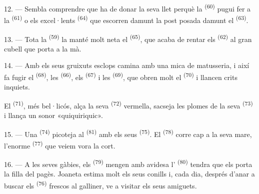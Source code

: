 12. --- Sembla comprendre que ha de donar la seva llet perquè la 
\textsuperscript{(60)} pugui fer  a la 
\textsuperscript{(61)} o els excel·lents 
\textsuperscript{(64)} que escorren damunt la post posada damunt el
 \textsuperscript{(63)}.

13. --- Tota la  \textsuperscript{(59)} la manté molt neta el
 \textsuperscript{(65)}, que acaba de rentar els
 \textsuperscript{(62)} al gran cubell que porta a la
mà.

\VUsaut{3.0mm}
\VUsaut{3.0mm}

14. --- Amb els seus gruixuts esclops camina amb una mica de matusseria, i així
fa fugir el  \textsuperscript{(68)}, les 
\textsuperscript{(66)}, els  \textsuperscript{(67)} i les
 \textsuperscript{(69)}, que obren molt el 
\textsuperscript{(70)} i llancen crits inquiets.

El  \textsuperscript{(71)}, més bel·licós, alça la seva
 \textsuperscript{(72)} vermella, sacseja les plomes de la seva
 \textsuperscript{(73)} i llança un sonor «quiquiriquic».

15. --- Una  \textsuperscript{(74)} picoteja al 
\textsuperscript{(81)} amb els seus  \textsuperscript{(75)}. El
 \textsuperscript{(78)} corre cap a la seva mare, l'enorme
 \textsuperscript{(77)} que veiem vora la cort.

16. --- A les seves gàbies, els  \textsuperscript{(79)} mengen amb
avidesa l' \textsuperscript{(80)} tendra que els porta la filla del
pagès. Joaneta estima molt els seus conills i, cada dia, després d'anar a buscar
els  \textsuperscript{(76)} frescos al galliner, ve a visitar els seus
amiguets.
\VUsaut{6.0mm}
\VUfilet{22mm}
